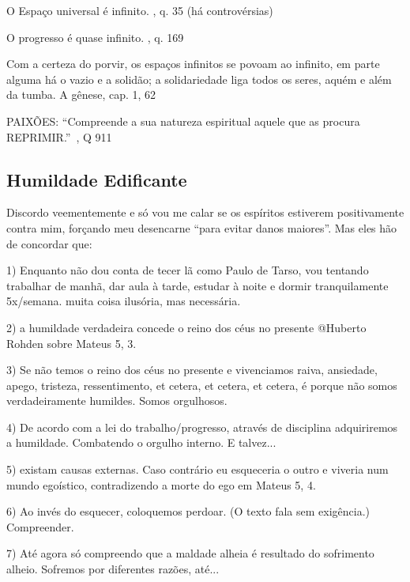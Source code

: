 \documentclass[12pt,a4paper]{article}
\begin{document}
O Espa\c{c}o universal \'e infinito. \cite{le}, q. 35 (h\'a controv\'ersias)

O progresso \'e quase infinito. \cite{le}, q. 169

Com a certeza do porvir, os espa\c{c}os infinitos se povoam ao infinito, em parte alguma h\'a o vazio e a solid\~ao; a solidariedade liga todos os seres, aqu\'em e al\'em da tumba. A g\^enese, cap. 1, 62

			\begin{flushright}
			\end{flushright}

PAIX\~OES: \textquotedblleft Compreende a sua natureza espiritual aquele que as procura REPRIMIR.\textquotedblright\, \cite{le}, Q 911

\subsection{Humildade Edificante}
			\begin{flushright}
			\end{flushright}

Discordo veementemente e s\'o vou me calar se os esp\'iritos estiverem
positivamente contra mim, for\c{c}ando meu desencarne \textquotedblleft para evitar danos
maiores\textquotedblright. Mas eles h\~ao de concordar que:

1) Enquanto n\~ao dou conta de tecer l\~a como Paulo de Tarso, vou tentando
trabalhar de manh\~a, dar aula \`a tarde, estudar \`a noite e dormir
tranquilamente 5x/semana. muita coisa ilus\'oria, mas necess\'aria.

2) a humildade verdadeira concede o reino dos c\'eus no presente @Huberto
Rohden sobre Mateus 5, 3.

3) Se n\~ao temos o reino dos c\'eus no presente e vivenciamos raiva,
ansiedade, apego, tristeza, ressentimento, et cetera, et cetera, et
cetera, \'e porque n\~ao somos verdadeiramente humildes. Somos orgulhosos.

4) De acordo com a lei do trabalho/progresso, atrav\'es de disciplina
adquiriremos a humildade. Combatendo o orgulho interno. E talvez...

5) existam causas externas. Caso contr\'ario eu esqueceria o outro e
viveria num mundo ego\'istico, contradizendo a morte do ego em Mateus 5,
4.

6) Ao inv\'es do esquecer, coloquemos perdoar. (O texto fala sem
exig\^encia.) Compreender.

7) At\'e agora s\'o compreendo que a maldade alheia \'e resultado do
sofrimento alheio. Sofremos por diferentes raz\~oes, at\'e...
\end{document}
